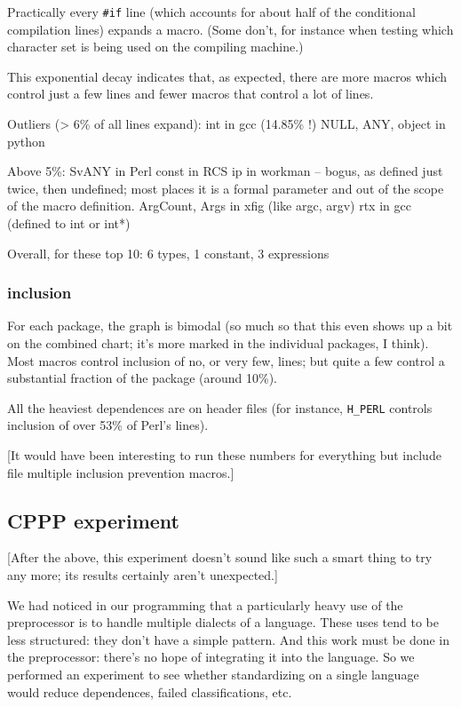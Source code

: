 \documentclass[10pt]{article}
\begin{document}
Practically every {\tt \#if} line (which accounts for about half of the
conditional compilation lines) expands a macro.  (Some don't, for instance
when testing which character set is being used on the compiling machine.)

        This exponential decay indicates that, as expected, there are more
          macros which control just a few lines and fewer macros that
          control a lot of lines.

        Outliers (> 6\% of all lines expand):
          int in gcc (14.85\% !)
          NULL, ANY, object in python

        Above 5\%: 
          SvANY in Perl
          const in RCS
          ip in workman -- bogus, as defined just twice, then undefined;
                  most places it is a formal parameter and out of the scope
                  of the macro definition.
          ArgCount, Args in xfig (like argc, argv)
          rtx in gcc (defined to int or int*)

        Overall, for these top 10:  6 types, 1 constant, 3 expressions

   \subsubsection{inclusion}

        For each package, the graph is bimodal (so much so that this even
          shows up a bit on the combined chart; it's more marked in the
          individual packages, I think).  Most macros control inclusion of
          no, or very few, lines; but quite a few control a substantial
          fraction of the package (around 10\%).

        All the heaviest dependences are on header files (for instance,
          \verb|H_PERL| controls inclusion of over 53\% of Perl's lines).

        [It would have been interesting to run these numbers for everything
          but include file multiple inclusion prevention macros.]


\subsection{CPPP experiment}

    [After the above, this experiment doesn't sound like such a smart thing
      to try any more; its results certainly aren't unexpected.]

    We had noticed in our programming that a particularly heavy use of the
      preprocessor is to handle multiple dialects of a language.  These uses
      tend to be less structured:  they don't have a simple pattern.  And
      this work must be done in the preprocessor:  there's no hope of
      integrating it into the language.  So we performed an experiment to
      see whether standardizing on a single language would reduce
      dependences, failed classifications, etc.
\end{document}
